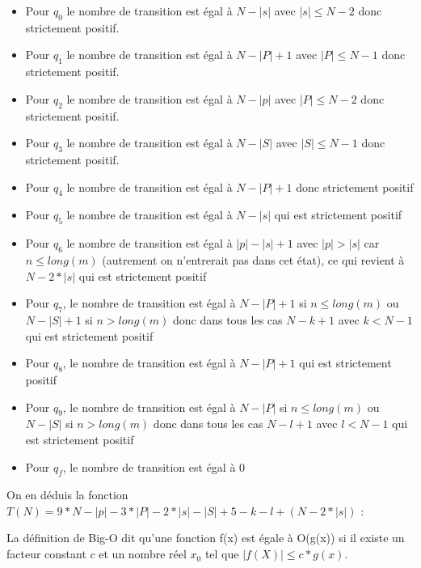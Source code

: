 \documentclass{report}
\begin{document}
\begin{itemize}
\item Pour $q_0$ le nombre de transition est égal à $N - |s|$ avec $|s| \leq N - 2$ donc strictement positif.
\item Pour $q_1$ le nombre de transition est égal à $N - |P| + 1$ avec $|P| \leq N - 1$ donc strictement positif.
\item Pour $q_2$ le nombre de transition est égal à $N - |p|$ avec $|P| \leq N - 2$ donc strictement positif.
\item Pour $q_3$ le nombre de transition est égal à $N - |S|$ avec $|S| \leq N - 1$ donc strictement positif.
\item Pour $q_4$ le nombre de transition est égal à $N - |P| + 1$ donc strictement positif
\item Pour $q_5$ le nombre de transition est égal à $N - |s|$ qui est strictement positif
\item Pour $q_6$ le nombre de transition est égal à $|p| - |s| + 1$ avec $|p| > |s|$ car $n \leq long(m)$ (autrement on n'entrerait pas dans cet état), ce qui revient à $N - 2 * |s|$ qui est strictement positif
\item Pour $q_7$, le nombre de transition est égal à $N - |P| + 1$ si $n \leq long(m)$ ou $N - |S| + 1$ si $n > long(m)$ donc dans tous les cas $N - k + 1$ avec $k < N - 1$ qui est strictement positif
\item Pour $q_8$, le nombre de transition est égal à $N - |P| + 1$ qui est strictement positif
\item Pour $q_9$, le nombre de transition est égal à $N - |P|$ si $n \leq long(m)$ ou $N - |S|$ si $n > long(m)$ donc dans tous les cas $N - l + 1$ avec $l < N - 1$ qui est strictement positif
\item Pour $q_f$, le nombre de transition est égal à $0$
\end{itemize}

\vspace{5mm}

On en déduis la fonction $T(N) = 9 * N - |p| - 3 * |P| - 2 * |s| - |S| + 5 - k - l + (N - 2 * |s|)$ :

\vspace{5mm}

La définition de Big-O dit qu'une fonction f(x) est égale à O(g(x)) si il existe un facteur constant $c$ et un nombre réel $x_0$ tel que $|f(X)| \leq c * g(x)$.

\vspace{5mm}
\end{document}
